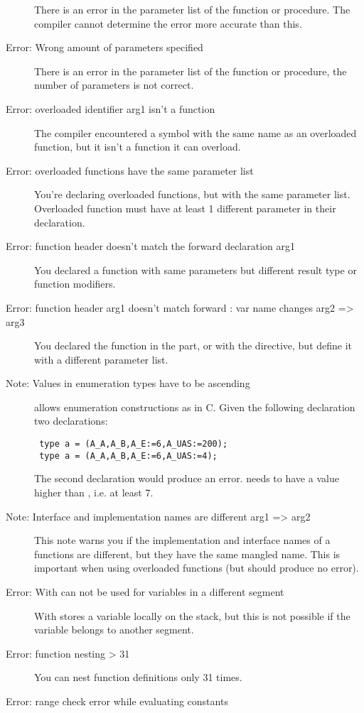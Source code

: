 \begin{description}
 There is an error in the parameter list of the function or procedure.
 The compiler cannot determine the error more accurate than this.
\item [Error: Wrong amount of parameters specified]
 There is an error in the parameter list of the function or procedure,
 the number of parameters is not correct.
\item [Error: overloaded identifier arg1 isn't a function]
 The compiler encountered a symbol with the same name as an overloaded
 function, but it isn't a function it can overload.
\item [Error: overloaded functions have the same parameter list]
 You're declaring overloaded functions, but with the same parameter list.
 Overloaded function must have at least 1 different parameter in their
 declaration.
\item [Error: function header doesn't match the forward declaration arg1]
 You declared a function with same parameters but
 different result type or function modifiers.
\item [Error: function header arg1 doesn't match forward : var name changes arg2 => arg3]
 You declared the function in the  part, or with the
  directive, but define it with a different parameter list.
\item [Note: Values in enumeration types have to be ascending]
 \fpc allows enumeration constructions as in C. Given the following
 declaration two declarations:
 \begin{verbatim}
 type a = (A_A,A_B,A_E:=6,A_UAS:=200);
 type a = (A_A,A_B,A_E:=6,A_UAS:=4);
 \end{verbatim}
 The second declaration would produce an error.  needs to have a
 value higher than , i.e. at least 7.
\item [Note: Interface and implementation names are different arg1 => arg2]
 This note warns you if the implementation and interface names of a
 functions are different, but they have the same mangled name. This
 is important when using overloaded functions (but should produce no error).
\item [Error: With can not be used for variables in a different segment]
 With stores a variable locally on the stack,
 but this is not possible if the variable belongs to another segment.
\item [Error: function nesting > 31]
 You can nest function definitions only 31 times.
\item [Error: range check error while evaluating constants]

\end{description}
